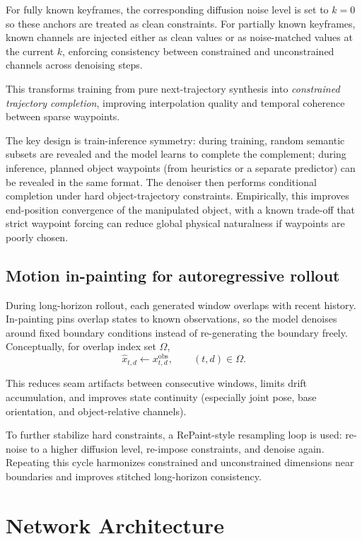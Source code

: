 For fully known keyframes, the corresponding diffusion noise level is set to $k=0$ so these anchors are treated as clean constraints. For partially known keyframes, known channels are injected either as clean values or as noise-matched values at the current $k$, enforcing consistency between constrained and unconstrained channels across denoising steps.

This transforms training from pure next-trajectory synthesis into \emph{constrained trajectory completion}, improving interpolation quality and temporal coherence between sparse waypoints.

The key design is train-inference symmetry: during training, random semantic subsets are revealed and the model learns to complete the complement; during inference, planned object waypoints (from heuristics or a separate predictor) can be revealed in the same format. The denoiser then performs conditional completion under hard object-trajectory constraints. Empirically, this improves end-position convergence of the manipulated object, with a known trade-off that strict waypoint forcing can reduce global physical naturalness if waypoints are poorly chosen.

\subsection{Motion in-painting for autoregressive rollout}

During long-horizon rollout, each generated window overlaps with recent history. In-painting pins overlap states to known observations, so the model denoises around fixed boundary conditions instead of re-generating the boundary freely. Conceptually, for overlap index set $\Omega$,
\[
\hat x_{t,d} \leftarrow x^{\mathrm{obs}}_{t,d}, \qquad (t,d)\in\Omega.
\]

This reduces seam artifacts between consecutive windows, limits drift accumulation, and improves state continuity (especially joint pose, base orientation, and object-relative channels).

To further stabilize hard constraints, a RePaint-style resampling loop is used: re-noise to a higher diffusion level, re-impose constraints, and denoise again. Repeating this cycle harmonizes constrained and unconstrained dimensions near boundaries and improves stitched long-horizon consistency.

\section{Network Architecture}

